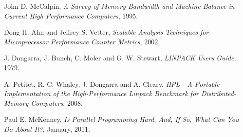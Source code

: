 \documentclass[a4paper]{report}
\begin{document}
\begin{thebibliography}{9}
 John D. McCalpin,
 \emph{A Survey of Memory Bandwidth and Machine Balance in Current High Performance Computers},
 1995.

 Dong H. Ahn and Jeffrey S. Vetter,
 \emph{Scalable Analysis Techniques for Microprocessor Performance Counter Metrics},
 2002.

 J. Dongarra, J. Bunch, C. Moler and G. W. Stewart, 
 \emph{LINPACK Users Guide},
 1979.

 A. Petitet, R. C. Whaley, J. Dongarra and A. Cleary, 
 \emph{HPL - A Portable Implementation of the High-Performance Linpack Benchmark for Distributed-Memory Computers},
 2008.

Paul E. McKenney,
\emph{Is Parallel Programming Hard, And, If So, What Can You Do About It?},
January, 2011.

\end{thebibliography}
\end{document}
